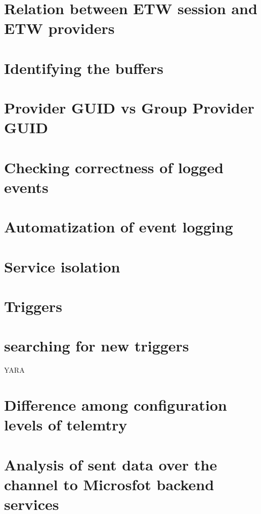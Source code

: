 \section{Relation between ETW session and ETW providers}
\section{Identifying the buffers}
\section{Provider GUID vs Group Provider GUID}
\section{Checking correctness of logged events}
\section{Automatization of event logging}
\section{Service isolation}
\section{Triggers}
\section{searching for new triggers} YARA
\section{Difference among configuration levels of telemtry}
\section{Analysis of sent data over the channel to Microsfot backend services}
